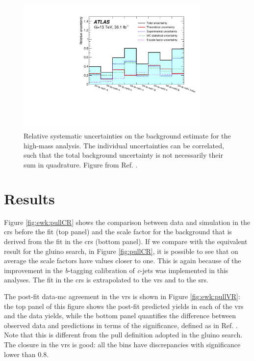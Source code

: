 \begin{figure}[htbp]
	\centering
	\includegraphics[width=0.85\textwidth]{figures/ewk_prod/etmiss_misc/High-MET-syst.pdf}
	\caption{Relative systematic uncertainties on the background estimate for the high-mass analysis. The individual uncertainties can be correlated, such that the total background uncertainty is not necessarily their sum in quadrature. Figure from Ref. \cite{Aaboud:2018htj}. 
	} 
	\label{fig:syst_etmiss}
\end{figure}

\section{Results}
\label{sec:ewk:results}

Figure \ref{fig:ewk:pullCR} shows the comparison between data and simulation in the \glspl{cr} before the fit (top panel)
and the scale factor for the \ttbar background that is derived from the fit in the \glspl{cr} (bottom panel).
If we compare with the equivalent result for the gluino search, in Figure \ref{fig:pullCR}, it is possible 
to see that on average the \ttbar scale factors have values closer to one. 
This is again because of the improvement in the \textit{b}-tagging calibration of \textit{c}-jets was implemented in this analyses. 
The fit in the \glspl{cr} is extrapolated to the \glspl{vr} and to the \glspl{sr}. 

The post-fit data-\gls{mc} agreement in the \glspl{vr} is shown in Figure \ref{fig:ewk:pullVR}: the top panel of this figure 
shows the post-fit predicted yields in each of the \glspl{vr} and the data yields, while the bottom panel quantifies the 
difference between observed data and predictions in terms of the significance, defined as in Ref. \cite{Choudalakis:2011okv}. 
Note that this is different from the pull definition adopted in the gluino search. 
The closure in the \glspl{vr} is good: all the bins have discrepancies with significance lower than 0.8. 


